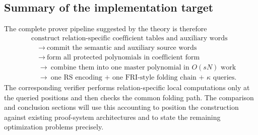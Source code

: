 \subsection{Summary of the implementation target}
\label{sec:complexity-summary}

The complete prover pipeline suggested by the theory is therefore
\begin{equation}
\begin{split}
  &\text{construct relation-specific coefficient tables and auxiliary words}
  \\
  &\quad\longrightarrow\
  \text{commit the semantic and auxiliary source words}
  \\
  &\quad\longrightarrow\
  \text{form all protected polynomials in coefficient form}
  \\
  &\quad\longrightarrow\
  \text{combine them into one master polynomial in $O(sN)$ work}
  \\
  &\quad\longrightarrow\
  \text{one RS encoding + one FRI-style folding chain + $\kappa$ queries}.
\end{split}
\label{eq:implementation-pipeline}
\end{equation}
The corresponding verifier performs relation-specific local computations only at the queried positions and then checks the common folding path.  The comparison and conclusion sections will use this accounting to position the construction against existing proof-system architectures and to state the remaining optimization problems precisely.
